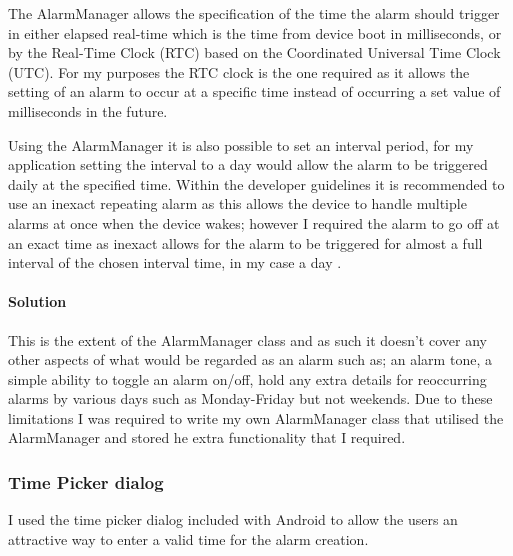 The AlarmManager allows the specification of the time the alarm should
trigger in either elapsed real-time which is the time from device boot
in milliseconds, or by the Real-Time Clock (RTC) based on the
Coordinated Universal Time Clock (UTC). For my purposes the RTC clock is
the one required as it allows the setting of an alarm to occur at a
specific time instead of occurring a set value of milliseconds in the
future.

Using the AlarmManager it is also possible to set an interval period,
for my application setting the interval to a day would allow the alarm
to be triggered daily at the specified time. Within the developer
guidelines it is recommended to use an inexact repeating alarm as this
allows the device to handle multiple alarms at once when the device
wakes; however I required the alarm to go off at an exact time as
inexact allows for the alarm to be triggered for almost a full interval
of the chosen interval time, in my case a day \parencite{alarmManager}.

\paragraph{Solution}\label{solution}

This is the extent of the AlarmManager class and as such it doesn't
cover any other aspects of what would be regarded as an alarm such as;
an alarm tone, a simple ability to toggle an alarm on/off, hold any
extra details for reoccurring alarms by various days such as
Monday-Friday but not weekends. Due to these limitations I was required
to write my own AlarmManager class that utilised the AlarmManager and
stored he extra functionality that I required.

\subsubsection{Time Picker dialog}\label{time-picker-dialog}

I used the time picker dialog included with Android to allow the users
an attractive way to enter a valid time for the alarm creation.

